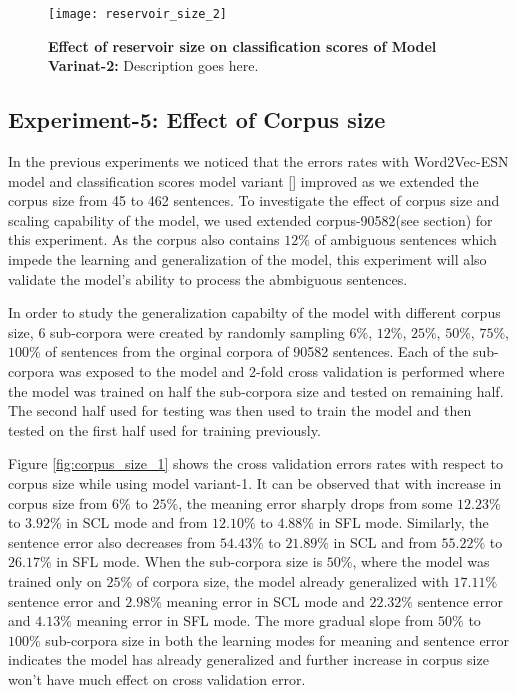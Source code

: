 {{\begin{figure}[hbtp]
\centering
\texttt{[image: reservoir\_size\_2]}
\caption[Effect of reservoir size on Word2Vec-ESNM model variant]{\textbf{Effect of reservoir size on classification scores of Model Varinat-2:} Description goes here.}
\label{fig:reservoir_size_2}
\end{figure}

\subsection{Experiment-5: Effect of Corpus size}

In the previous experiments we noticed that the errors rates with Word2Vec-ESN model and classification scores model variant [] improved as we extended the corpus size from 45 to 462 sentences. To investigate the effect of corpus size and scaling capability of the model, we used extended corpus-90582(see section) for this experiment. As the corpus also contains $12\%$ of ambiguous sentences which impede the learning and generalization of the model, this experiment will also validate the model's ability to process the abmbiguous sentences.

In order to study the generalization capabilty of the model with different corpus size,  6 sub-corpora were created by randomly sampling $6\%$, $12\%$, $25\%$, $50\%$, $75\%$, $100\%$ of sentences from the orginal corpora of 90582 sentences\cite{end-to-end}. Each of the sub-corpora was exposed to the model and 2-fold cross validation is performed where the model was trained on half the sub-corpora size and tested on remaining half. The second half used for testing was then used to train the model and then tested on the first half used for training previously.

Figure \ref{fig:corpus_size_1} shows the cross validation errors rates with respect to corpus size while using model variant-1. It can be observed that with increase in corpus size from $6 \%$  to $25 \%$, the meaning error sharply drops from some $12.23 \%$ to $3.92 \%$ in SCL mode and from $12.10\%$ to $4.88 \%$ in SFL mode. Similarly, the sentence error also decreases from $54.43 \%$ to $21.89 \%$ in SCL and from $55.22 \%$ to $26.17 \%$ in SFL mode. When the sub-corpora size is $50\%$, where the model was trained only on $25\%$ of corpora size, the model already generalized with $17.11 \%$ sentence error and $2.98 \%$ meaning error in SCL mode and  $22.32 \%$ sentence error and $4.13 \%$ meaning error in SFL mode. The more gradual slope from $50 \%$ to $100 \%$ sub-corpora size in both the learning modes for meaning and sentence error indicates the model has already generalized and further increase in corpus size won’t have much effect on cross validation error.
 

}}
